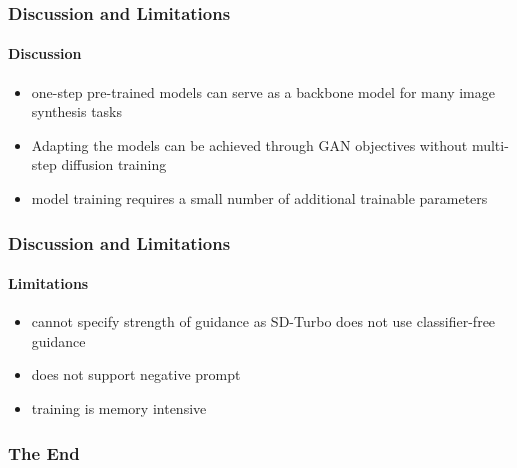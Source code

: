 \documentclass[aspectratio=169, lecture, amberg]{OTHAWbeamer}
\begin{document}
\begin{frame}
\frametitle{Discussion and Limitations}
\framesubtitle{Discussion}
\begin{itemize}
    \item one-step pre-trained models can serve as a backbone model for many image synthesis tasks
    \item Adapting the models can be achieved through GAN objectives without multi-step diffusion training
    \item model training requires a small number of additional trainable parameters
\end{itemize}
\end{frame}

\begin{frame}
\frametitle{Discussion and Limitations}
\framesubtitle{Limitations}
\begin{itemize}
    \item cannot specify strength of guidance as SD-Turbo does not use classifier-free guidance
    \item does not support negative prompt
    \item training is memory intensive
\end{itemize}

\end{frame}

\begin{frame}
\frametitle{The End}
\begin{center}
\scalebox{2}{Questions?}
\end{center}
\end{frame}
\end{document}
